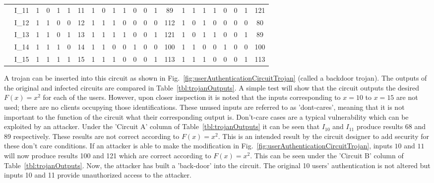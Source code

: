 \begin{table}[]
\begin{tabular}{CC|C|C|C|C|C||C|C|C|C|C|C|C|C||C|C|C|C|C|C|C|C|}
		 & I_{11} & 1 & 0 & 1 & 1 & 11 & 1 & 0 & 1 & 1 & 0 & 0 & 1 & 89 & 1 & 1 & 1 & 1 & 0 & 0 & 1 & 121 \\ 
		 & I_{12} & 1 & 1 & 0 & 0 & 12 & 1 & 1 & 1 & 0 & 0 & 0 & 0 & 112 & 1 & 0 & 1 & 0 & 0 & 0 & 0 & 80 \\ 
		 & I_{13} & 1 & 1 & 0 & 1 & 13 & 1 & 1 & 1 & 1 & 0 & 0 & 1 & 121 & 1 & 0 & 1 & 1 & 0 & 0 & 1 & 89 \\ 
		 & I_{14} & 1 & 1 & 1 & 0 & 14 & 1 & 1 & 0 & 0 & 1 & 0 & 0 & 100 & 1 & 1 & 0 & 0 & 1 & 0 & 0 & 100 \\ 
		 & I_{15} & 1 & 1 & 1 & 1 & 15 & 1 & 1 & 1 & 0 & 0 & 0 & 1 & 113 & 1 & 1 & 1 & 0 & 0 & 0 & 1 & 113 \\ \hline
	\end{tabular}
\end{table}
A trojan can be inserted into this circuit as shown in Fig.~\ref{fig:userAuthenticationCircuitTrojan} (called a backdoor trojan).
The outputs of the original and infected circuits are compared in Table~\ref{tbl:trojanOutputs}.
A simple test will show that the circuit outputs the desired $F(x) = x^2$ for each of the users.
However, upon closer inspection it is noted that the inputs corresponding to $x = 10$ to $x = 15$ are not used; there are no clients occupying those identifications.
These unused inputs are referred to as 'dont-cares', meaning that it is not important to the function of the circuit what their corresponding output is.
Don't-care cases are a typical vulnerability which can be exploited by an attacker.
Under the 'Circuit A' column of Table~\ref{tbl:trojanOutputs} it can be seen that $I_{10}$ and $I_{11}$ produce results 68 and 89 respectively.
These results are not correct according to $F(x) = x^2$.
This is an intended result by the circuit designer to add security for these don't care conditions.
If an attacker is able to make the modification in Fig.~\ref{fig:userAuthenticationCircuitTrojan}, inputs $10$ and $11$ will now produce results 100 and 121 which are correct according to $F(x) = x^2$.
This can be seen under the 'Circuit B' column of Table~\ref{tbl:trojanOutputs}.
Now, the attacker has built a 'back-door' into the circuit.
The original 10 users' authentication is not altered but inputs 10 and 11 provide unauthorized access to the attacker.

